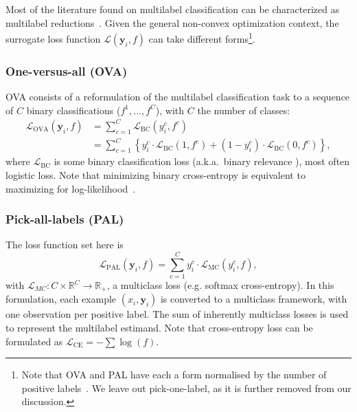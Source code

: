 Most of the literature found on multilabel classification can be characterized as multilabel reductions~\cite{multilabelReduction}. Given the general non-convex optimization context, the surrogate loss function $\mathcal{L}(\mathbf{y}_i, f)$ can take different forms\footnote{Note that OVA and PAL have each a form normalised by the number of positive labels~\cite{multilabelReduction}. We leave out pick-one-label, as it is further removed from our discussion.}. 

\subsubsection*{One-versus-all (OVA)}
OVA consists of a reformulation of the multilabel classification task to a sequence of $C$ binary classifications ($f^1, \ldots, f^C$), with $C$ the number of classes:
%
\begin{equation}
\begin{aligned}
\mathcal{L}_{\mathrm{OVA}}(\mathbf{y}_i, f) &= \sum_{c = 1}^C \mathcal{L}_{\mathrm{BC}}\left(y_i^{c}, f^{c}\right)\\
&=\sum_{c = 1}^C \left\{y_{i}^c \cdot \mathcal{L}_{\mathrm{BC}}\left(1, f^c \right)+\left(1-y_{i}^c \right) \cdot \mathcal{L}_{\mathrm{BC}}\left(0, f^c \right)\right\},
\end{aligned}
\end{equation}
%
where $\mathcal{L}_{\mathrm{BC}}$ is some binary classification loss (a.k.a.\ binary relevance \cite{OVA1, hammingLoss, OVA2}), most often logistic loss.  Note that minimizing binary cross-entropy is equivalent to maximizing for log-likelihood~\cite[Section 4.3.4]{Bishop}.

\subsubsection*{Pick-all-labels (PAL)}
The loss function set here is
%
\begin{equation}
\mathcal{L}_{\mathrm{PAL}}(\mathbf{y}_i, f) = \sum_{c = 1}^C y_{i}^c \cdot \mathcal{L}_{\mathrm{MC}}(y_i^c, f),
\end{equation}
%
with $\mathcal{L}_{MC} : C \times \mathbb{R}^{C} \rightarrow \mathbb{R}_{+}$, a multiclass loss (e.g. softmax cross-entropy). In this formulation, each example $(x_i, \mathbf{y}_i)$ is converted to a multiclass framework, with one observation per positive label. The sum of inherently multiclass losses is used to represent the multilabel estimand. Note that cross-entropy loss can be formulated as \(\mathcal{L}_{\text {CE}}=-\sum \log \left(f \right)\).


